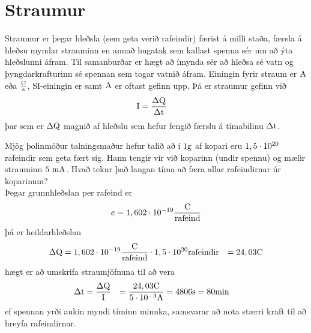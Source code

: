 \section{Straumur}
Straumur er þegar hleðsla (sem geta verið rafeindir) færist á milli staða, færsla
á hleðsu myndar strauminn en annað hugatak sem kallast spenna sér um að ýta
hleðslunni áfram. Til samanburðar er hægt að ímynda sér að hleðsa sé vatn og
þyngdarkrafturinn sé spennan sem togar vatnið áfram. Einingin fyrir straum er
$\textrm{A}$ eða $\frac{\textrm{C}}{\textrm{s}}$, SI-einingin er samt $\textrm{A}$ er oftast gefinn upp.
Þá er straumur gefinn við
\begin{align}
	\textrm{I} &= \frac{\Delta\textrm{Q}}{\Delta\textrm{t}}
\end{align}
þar sem er $\Delta\textrm{Q}$ magnið af hleðslu sem hefur fengið færslu á 
tímabilinu $\Delta\textrm{t}$.
\begin{formalexample}
Mjög þolinmóður talningsmaður hefur talið að í $1\textrm{g}$ af kopari eru
$1,5 \cdot 10^{20}$ rafeindir sem geta fært sig. Hann tengir vír við 
koparinn (undir spennu) og mælir strauminn $5 \textrm{ m}\textrm{A}$. Hvað tekur það
langan tíma að færa allar rafeindirnar úr koparinum?
\\[4 ex]
Þegar grunnhleðslan per rafeind er
\[
	e = 1,602 \cdot 10^{-19} \frac{\text{C}}{\text{rafeind}}
\]
þá er heildarhleðslan
\begin{align*}
	\Delta\textrm{Q} &=
		1,602 \cdot 10^{-19} \frac{\text{C}}{\text{rafeind}} \cdot
		1,5 \cdot 10^{20} \text{rafeindir}
	&= 24,03 \text{C}
\end{align*}
hægt er að umskrifa straumjöfnuna til að vera
\begin{align*}
	\Delta\textrm{t} &= \frac{\Delta\textrm{Q}}{\textrm{I}}
		&= \frac{24,03 \text{C}}{5 \cdot 10^{-3} \textrm{A}}
		&= 4806 \textrm{s} = 80 \text{min}
\end{align*}
ef spennan yrði aukin myndi tíminn minnka, samsvarar að nota stærri kraft til að
hreyfa rafeindirnar.
\end{formalexample}
